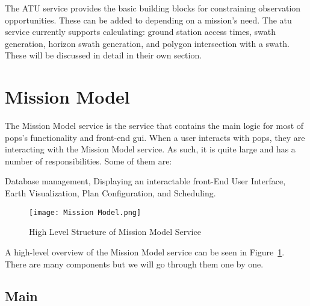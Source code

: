 The ATU service provides the basic building blocks for
constraining observation opportunities. These can be added to depending on a
mission’s need. The \gls{atu} service currently supports calculating: ground station
access times, swath generation, horizon swath generation, and polygon
intersection with a swath. These will be discussed in detail in their own
section.  



\section{Mission Model}
 
The Mission Model service is the service that contains the main logic for most
of \gls{pops}'s functionality and front-end \gls{gui}. When a user interacts
with \gls{pops}, they are interacting with the Mission Model service. As such,
it is quite large and has a number of responsibilities. Some of them are:

\begin{outline} 
    \1 Database management,
    \1 Displaying an interactable front-End User Interface,
    \1 Earth Visualization,
    \1 Plan Configuration, and
    \1 Scheduling.
\end{outline}


\begin{figure}[h]
    \centering
    \texttt{[image: Mission Model.png]} 
    \caption{High Level Structure of Mission Model Service}
    \label{fig:mission_model} 
\end{figure}

A high-level overview of the Mission Model service can be seen in
Figure~\ref{fig:mission_model}. There are many components but we will go
through them one by one.

\subsection{Main} 

